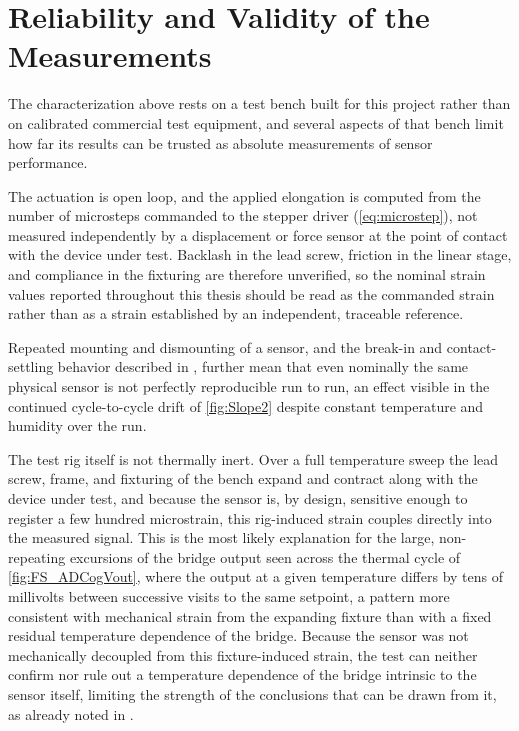 \section{Reliability and Validity of the Measurements}
The characterization above rests on a test bench built for this project rather than on calibrated commercial test equipment, and several aspects of that bench limit how far its results can be trusted as absolute measurements of sensor performance.

The actuation is open loop, and the applied elongation is computed from the number of microsteps commanded to the stepper driver (\cref{eq:microstep}), not measured independently by a displacement or force sensor at the point of contact with the device under test. Backlash in the lead screw, friction in the linear stage, and compliance in the fixturing are therefore unverified, so the nominal strain values reported throughout this thesis should be read as the commanded strain rather than as a strain established by an independent, traceable reference.

Repeated mounting and dismounting of a sensor, and the break-in and contact-settling behavior described in , further mean that even nominally the same physical sensor is not perfectly reproducible run to run, an effect visible in the continued cycle-to-cycle drift of \cref{fig:Slope2} despite constant temperature and humidity over the run.

The test rig itself is not thermally inert. Over a full temperature sweep the lead screw, frame, and fixturing of the bench expand and contract along with the device under test, and because the sensor is, by design, sensitive enough to register a few hundred microstrain, this rig-induced strain couples directly into the measured signal. This is the most likely explanation for the large, non-repeating excursions of the bridge output seen across the thermal cycle of \cref{fig:FS_ADCogVout}, where the output at a given temperature differs by tens of millivolts between successive visits to the same setpoint, a pattern more consistent with mechanical strain from the expanding fixture than with a fixed residual temperature dependence of the bridge. Because the sensor was not mechanically decoupled from this fixture-induced strain, the test can neither confirm nor rule out a temperature dependence of the bridge intrinsic to the sensor itself, limiting the strength of the conclusions that can be drawn from it, as already noted in .

